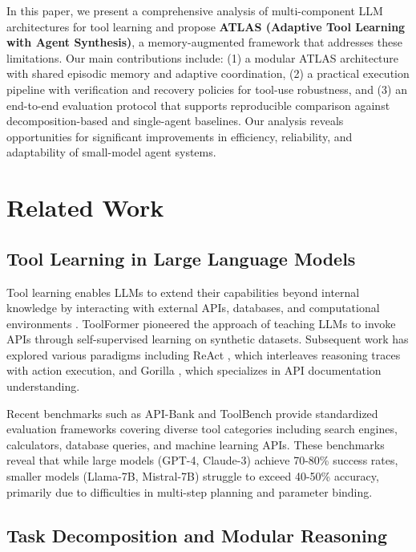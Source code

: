 \documentclass[conference]{IEEEtran}
\begin{document}
In this paper, we present a comprehensive analysis of multi-component LLM architectures for tool learning and propose \textbf{ATLAS (Adaptive Tool Learning with Agent Synthesis)}, a memory-augmented framework that addresses these limitations. Our main contributions include: (1) a modular ATLAS architecture with shared episodic memory and adaptive coordination, (2) a practical execution pipeline with verification and recovery policies for tool-use robustness, and (3) an end-to-end evaluation protocol that supports reproducible comparison against decomposition-based and single-agent baselines. Our analysis reveals opportunities for significant improvements in efficiency, reliability, and adaptability of small-model agent systems.


\section{Related Work}

\subsection{Tool Learning in Large Language Models}

Tool learning enables LLMs to extend their capabilities beyond internal knowledge by interacting with external APIs, databases, and computational environments \cite{schick2024toolformer, qin2023tool}. ToolFormer \cite{schick2024toolformer} pioneered the approach of teaching LLMs to invoke APIs through self-supervised learning on synthetic datasets. Subsequent work has explored various paradigms including ReAct \cite{yao2023react}, which interleaves reasoning traces with action execution, and Gorilla \cite{patil2023gorilla}, which specializes in API documentation understanding.

Recent benchmarks such as API-Bank \cite{li2023apibank} and ToolBench \cite{qin2023toolbench} provide standardized evaluation frameworks covering diverse tool categories including search engines, calculators, database queries, and machine learning APIs. These benchmarks reveal that while large models (GPT-4, Claude-3) achieve 70-80\% success rates, smaller models (Llama-7B, Mistral-7B) struggle to exceed 40-50\% accuracy, primarily due to difficulties in multi-step planning and parameter binding.

\subsection{Task Decomposition and Modular Reasoning}
\end{document}
